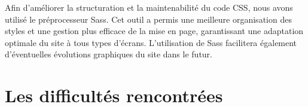 Afin d’améliorer la structuration et la maintenabilité du code CSS, nous avons utilisé le préprocesseur Sass. Cet outil a permis une meilleure organisation des styles et une gestion plus efficace de la mise en page, garantissant une adaptation optimale du site à tous types d’écrans. L’utilisation de Sass facilitera également d’éventuelles évolutions graphiques du site dans le futur.


\section{Les difficultés rencontrées}

